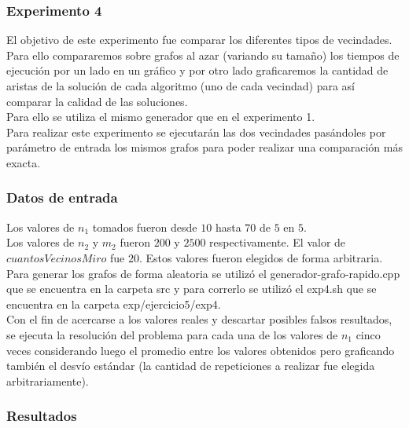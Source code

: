 \subsubsection*{Experimento 4}\;
\noindent El objetivo de este experimento fue comparar los diferentes tipos de vecindades. Para  ello compararemos sobre grafos al azar (variando su tamaño) los tiempos de ejecución por un lado en un gráfico y por otro lado graficaremos la cantidad de aristas de la solución de cada algoritmo (uno de cada vecindad) para así comparar la calidad de las soluciones. \\
Para ello se utiliza el mismo generador que en el experimento 1.\\
Para realizar este experimento se ejecutarán las dos vecindades pasándoles por parámetro de entrada los mismos grafos para poder realizar una comparación más exacta. \\

\subsubsection*{Datos de entrada}\;
    \noindent Los valores de $n_1$ tomados fueron desde $10$ hasta $70$ de $5$ en $5$. \\
       Los valores de $n_2$ y $m_2$ fueron $200$ y $2500$ respectivamente. El valor de $cuantosVecinosMiro$ fue $20$. Estos valores fueron elegidos de forma arbitraria. \\
        Para generar los grafos de forma aleatoria se utilizó el generador-grafo-rapido.cpp que se encuentra en la carpeta src y para correrlo se utilizó el exp4.sh que se encuentra en la carpeta exp/ejercicio5/exp4. \\
        Con el fin de acercarse a los valores reales y descartar posibles falsos resultados, se ejecuta la resolución del problema para cada una de los valores de $n_1$ cinco veces considerando luego el promedio entre los valores obtenidos pero graficando también el desvío estándar (la cantidad de repeticiones a realizar fue elegida arbitrariamente).\; 

\subsubsection*{Resultados}\;

